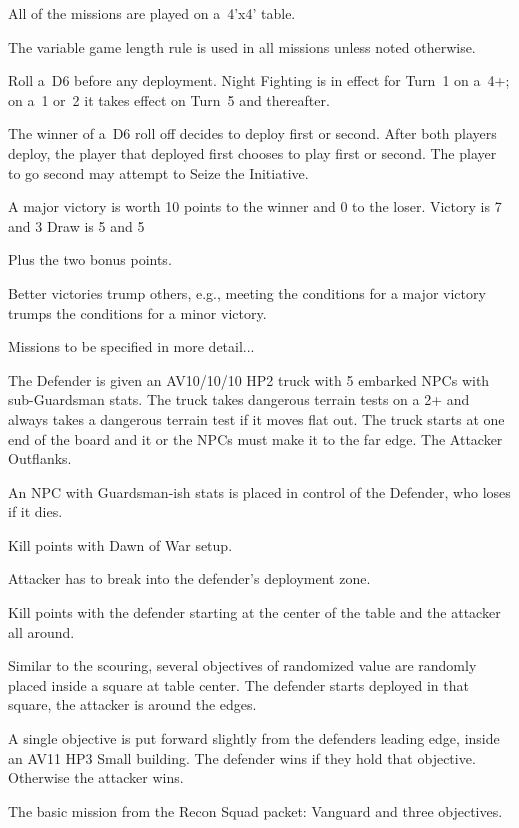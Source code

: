 \clearpage
{}


All of the missions are played on a~4'x4' table.

The variable game length rule is used in all missions unless noted otherwise.

  Roll a~D6 before any
deployment.  Night Fighting is in effect for Turn~1 on a~4+; on a~1
or~2 it takes effect on Turn~5 and thereafter.

The winner of a~D6 roll off decides to deploy first or second.  After
both players deploy, the player that deployed first chooses to play
first or second.  The player to go second may attempt to Seize the
Initiative.


A major victory is worth 10 points to the winner and 0 to the loser.
Victory is 7 and 3
Draw is 5 and 5

Plus the two bonus points.

Better victories trump others, e.g., meeting the conditions for a
major victory trumps the conditions for a minor victory.

Missions to be specified in more detail...


The Defender is given an AV10/10/10 HP2 truck with 5 embarked NPCs
with sub-Guardsman stats.  The truck takes dangerous terrain tests on
a 2+ and always takes a dangerous terrain test if it moves flat out.
The truck starts at one end of the board and it or the NPCs must make
it to the far edge.  The Attacker Outflanks.



An NPC with Guardsman-ish stats is placed in control of the Defender,
who loses if it dies.



Kill points with Dawn of War setup.



Attacker has to break into the defender's deployment zone.



Kill points with the defender starting at the center of the table and
the attacker all around.



Similar to the scouring, several objectives of randomized value are
randomly placed inside a square at table center.  The defender starts
deployed in that square, the attacker is around the edges.



A single objective is put forward slightly from the defenders leading
edge, inside an AV11 HP3 Small building.  The defender wins if they
hold that objective.  Otherwise the attacker wins.



The basic mission from the Recon Squad packet: Vanguard and three objectives.
